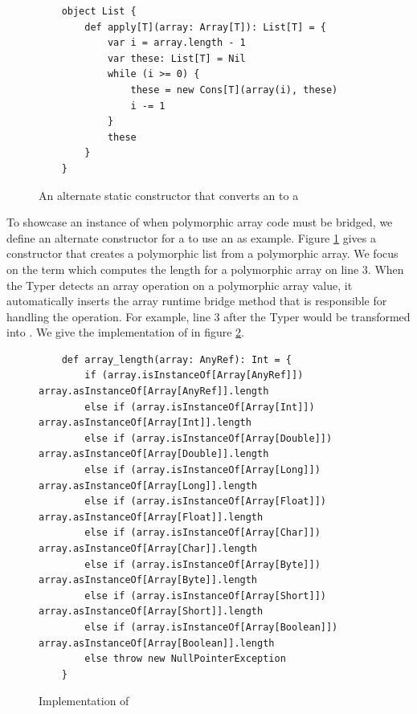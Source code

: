 \begin{figure}[!htb]
	\begin{verbatim}
	object List {
		def apply[T](array: Array[T]): List[T] = {
			var i = array.length - 1
			var these: List[T] = Nil
			while (i >= 0) {
				these = new Cons[T](array(i), these)
				i -= 1
			}
			these
		}	
	}
	\end{verbatim}
	\caption{An alternate static constructor that converts an  to a }
	\label{impl:list-alt-constructor}
\end{figure}

To showcase an instance of when polymorphic array code must be bridged, we define an alternate constructor for a  to use an as example.
Figure \ref{impl:list-alt-constructor} gives a constructor that creates a polymorphic list from a polymorphic array.
We focus on the term  which computes the length for a polymorphic array on line $3$.
When the Typer detects an array operation on a polymorphic array value, it automatically inserts the array runtime bridge method that is responsible for handling the operation.
For example, line $3$ after the Typer would be transformed into .
We give the implementation of  in figure \ref{impl:array-length}.

\begin{figure}[!htb]
	\begin{verbatim}
	def array_length(array: AnyRef): Int = {
		if (array.isInstanceOf[Array[AnyRef]])       array.asInstanceOf[Array[AnyRef]].length
		else if (array.isInstanceOf[Array[Int]])     array.asInstanceOf[Array[Int]].length
		else if (array.isInstanceOf[Array[Double]])  array.asInstanceOf[Array[Double]].length
		else if (array.isInstanceOf[Array[Long]])    array.asInstanceOf[Array[Long]].length
		else if (array.isInstanceOf[Array[Float]])   array.asInstanceOf[Array[Float]].length
		else if (array.isInstanceOf[Array[Char]])    array.asInstanceOf[Array[Char]].length
		else if (array.isInstanceOf[Array[Byte]])    array.asInstanceOf[Array[Byte]].length
		else if (array.isInstanceOf[Array[Short]])   array.asInstanceOf[Array[Short]].length
		else if (array.isInstanceOf[Array[Boolean]]) array.asInstanceOf[Array[Boolean]].length
		else throw new NullPointerException
	}
	\end{verbatim}
	\caption{Implementation of }
	\label{impl:array-length}
\end{figure}

